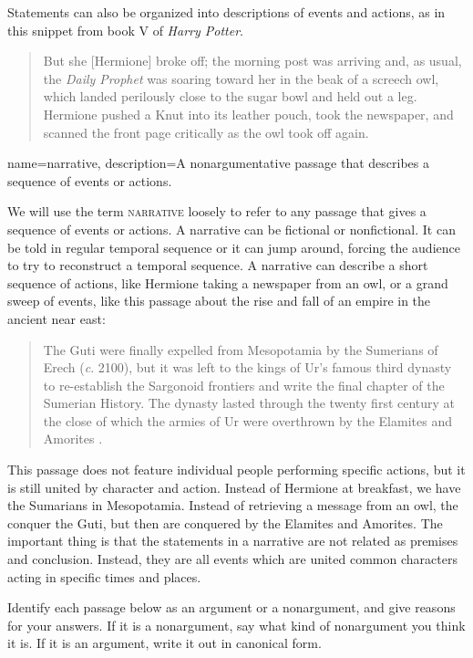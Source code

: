 Statements can also be organized into descriptions of events and actions, as in this snippet from book V of \textit{Harry Potter}.

\begin{quotation} \noindent But she [Hermione] broke off; the morning post was arriving and, as usual, the \textit{Daily Prophet} was soaring toward her in the beak of a screech owl, which landed perilously close to the sugar bowl and held out a leg. Hermione pushed a Knut into its leather pouch, took the newspaper, and scanned the front page critically as the owl took off again. \citep{Rowling2003} \end{quotation} 

{
name=narrative,
description={A nonargumentative passage that describes a sequence of events or actions.}
}

We will use the term \textsc{\gls{narrative}} \label{def:narrative} loosely to refer to any passage that gives a sequence of events or actions. A narrative can be fictional or nonfictional. It can be told in regular temporal sequence or it can jump around, forcing the audience to try to reconstruct a temporal sequence. A narrative can describe a short sequence of actions, like Hermione taking a newspaper from an owl, or a grand sweep of events, like this passage about the  rise and fall of an empire in the ancient near east:

\begin{quotation}\noindent The Guti were finally expelled from Mesopotamia by the Sumerians of Erech (\textit{c}. 2100), but it was left to the kings of Ur's famous third dynasty to re-establish the Sargonoid frontiers and write the final chapter of the Sumerian History. The dynasty lasted through the twenty first century at the close of which the armies of Ur were overthrown by the Elamites and Amorites \citep{McEvedy1967}. \end{quotation} 

This passage does not feature individual people performing specific actions, but it is still united by character and action. Instead of Hermione at breakfast, we have the Sumarians in Mesopotamia. Instead of retrieving a message from an owl, the conquer the Guti, but then are conquered by the Elamites and Amorites. The important thing is that the statements in a narrative are not related as premises and conclusion. Instead, they are all events which are united common characters acting in specific times and places. 


\practiceproblems
\problempart Identify each passage below as an argument or a nonargument, and give reasons for your answers. If it is a nonargument, say what kind of nonargument you think it is. If it is an argument, write it out in canonical form.

